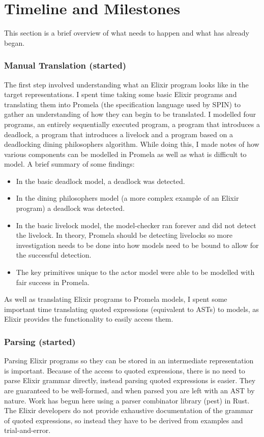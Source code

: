 \section[]{Timeline and Milestones}
This section is a brief overview of what needs to happen and what has already began.
\subsubsection[]{Manual Translation (started)}
The first step involved understanding what an Elixir program looks like in the target representations. I spent time taking some basic Elixir programs and translating them into Promela (the specification language used by SPIN) to gather an understanding of how they can begin to be translated. I modelled four programs, an entirely sequentially executed program, a program that introduces a deadlock, a program that introduces a livelock and a program based on a deadlocking dining philosophers algorithm. While doing this, I made notes of how various components can be modelled in Promela as well as what is difficult to model. A brief summary of some findings:
\begin{itemize}
    \item In the basic deadlock model, a deadlock was detected.
    \item In the dining philosophers model (a more complex example of an Elixir program) a deadlock was detected.
    \item In the basic livelock model, the model-checker ran forever and did not detect the livelock. In theory, Promela should be detecting livelocks so more investigation needs to be done into how models need to be bound to allow for the successful detection.
    \item The key primitives unique to the actor model were able to be modelled with fair success in Promela.
\end{itemize}
As well as translating Elixir programs to Promela models, I spent some important time translating quoted expressions (equivalent to ASTs) to models, as Elixir provides the functionality to easily access them.
\subsubsection[]{Parsing (started)}
Parsing Elixir programs so they can be stored in an intermediate representation is important. Because of the access to quoted expressions, there is no need to parse Elixir grammar directly, instead parsing quoted expressions is easier. They are guaranteed to be well-formed, and when parsed you are left with an AST by nature. Work has begun here using a parser combinator library (pest) in Rust. The Elixir developers do not provide exhaustive documentation of the grammar of quoted expressions, so instead they have to be derived from examples and trial-and-error.
